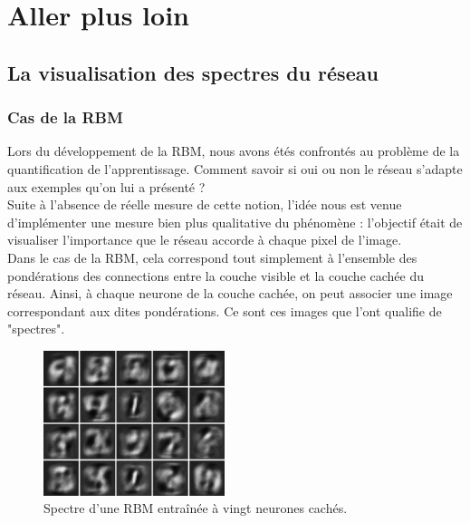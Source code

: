 \documentclass[a4paper,oneside]{report}
\begin{document}
        \chapter{Aller plus loin}

            \section{La visualisation des spectres du réseau}

\subsection{Cas de la RBM}

                Lors du développement de la RBM, nous avons étés confrontés au problème de la 
quantification de l'apprentissage. Comment savoir si oui ou non le réseau s'adapte aux 
exemples qu'on lui a présenté ?\\

                Suite à l'absence de réelle mesure de cette notion, l'idée nous est venue 
d'implémenter une mesure bien plus qualitative du phénomène : l'objectif était de 
visualiser l'importance que le réseau 
accorde à chaque pixel de l'image.\\

                Dans le cas de la RBM, cela correspond tout simplement à l'ensemble des pondérations 
des connections entre la couche visible et la couche cachée du réseau. Ainsi, à chaque 
neurone de la couche cachée, 
on peut associer une image correspondant aux dites pondérations. Ce sont ces images que l'ont qualifie 
de "spectres".

                \begin{figure}
                    \begin{center}
                        \includegraphics[width=150pt]{Images/filters-01.png}
                    \end{center}
                    \caption{Spectre d'une RBM entraînée à vingt neurones cachés.}
                \end{figure}
\end{document}
